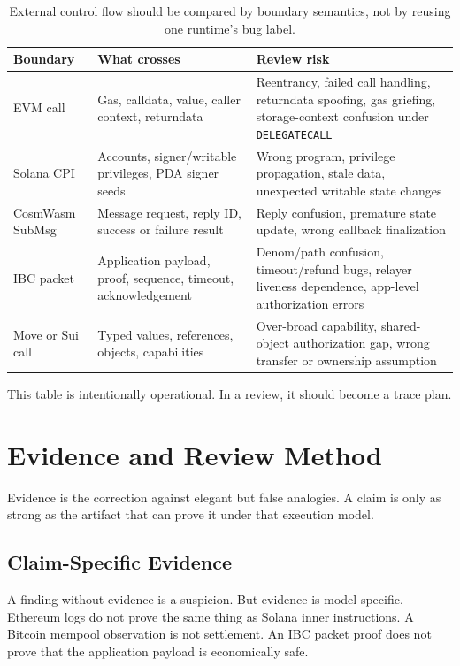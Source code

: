 \begin{table}[htbp]
\centering
\small
\renewcommand{\arraystretch}{1.18}
\begin{tabularx}{\textwidth}{@{}>{\RaggedRight\arraybackslash}p{}>{\RaggedRight\arraybackslash}p{}>{\RaggedRight\arraybackslash}X@{}}
\toprule
Boundary & What crosses & Review risk \\
\midrule
EVM call & Gas, calldata, value, caller context, returndata & Reentrancy, failed call handling, returndata spoofing, gas griefing, storage-context confusion under \texttt{DELEGATECALL} \\
Solana CPI & Accounts, signer/writable privileges, PDA signer seeds & Wrong program, privilege propagation, stale data, unexpected writable state changes \\
CosmWasm SubMsg & Message request, reply ID, success or failure result & Reply confusion, premature state update, wrong callback finalization \\
IBC packet & Application payload, proof, sequence, timeout, acknowledgement & Denom/path confusion, timeout/refund bugs, relayer liveness dependence, app-level authorization errors \\
Move or Sui call & Typed values, references, objects, capabilities & Over-broad capability, shared-object authorization gap, wrong transfer or ownership assumption \\
\bottomrule
\end{tabularx}
\caption{External control flow should be compared by boundary semantics, not by reusing one runtime's bug label.}
\end{table}

This table is intentionally operational. In a review, it should become a trace plan.

\section{Evidence and Review Method}

Evidence is the correction against elegant but false analogies. A claim is only as strong as the artifact that can prove it under that execution model.

\subsection{Claim-Specific Evidence}

A finding without evidence is a suspicion. But evidence is model-specific. Ethereum logs do not prove the same thing as Solana inner instructions. A Bitcoin mempool observation is not settlement. An IBC packet proof does not prove that the application payload is economically safe.

